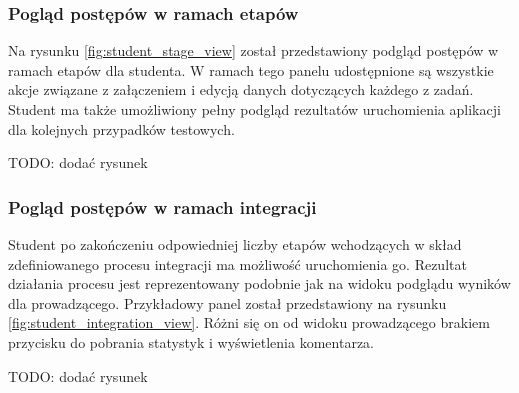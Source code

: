 \subsubsection{Pogląd postępów w ramach etapów}

Na rysunku \ref{fig:student_stage_view} został przedstawiony podgląd postępów w ramach etapów dla studenta.
W ramach tego panelu udostępnione są wszystkie akcje związane z załączeniem i edycją danych dotyczących każdego z zadań.
Student ma także umożliwiony pełny podgląd rezultatów uruchomienia aplikacji dla kolejnych przypadków testowych.

TODO: dodać rysunek

\subsubsection{Pogląd postępów w ramach integracji}

Student po zakończeniu odpowiedniej liczby etapów wchodzących w skład zdefiniowanego procesu integracji ma możliwość uruchomienia go.
Rezultat działania procesu jest reprezentowany podobnie jak na widoku podglądu wyników dla prowadzącego.
Przykładowy panel został przedstawiony na rysunku \ref{fig:student_integration_view}.
Różni się on od widoku prowadzącego brakiem przycisku do pobrania statystyk i wyświetlenia komentarza.

TODO: dodać rysunek